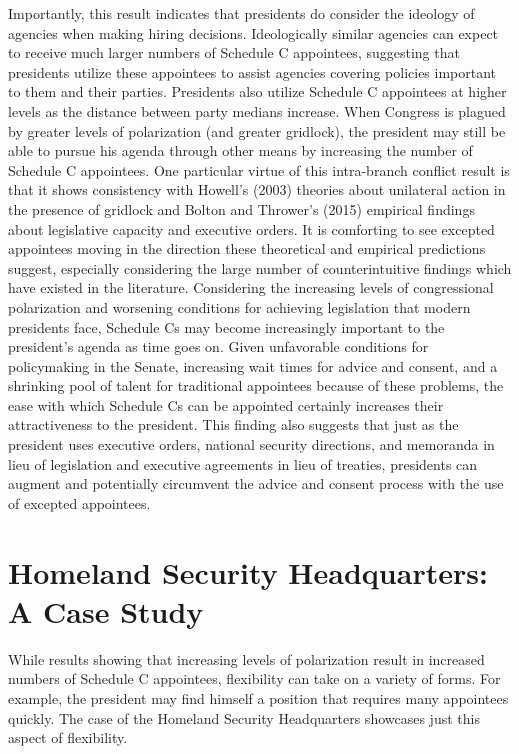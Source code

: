 \documentclass[12pt]{article}
\begin{document}
Importantly, this result indicates that presidents do consider the ideology of agencies when making hiring decisions. Ideologically similar agencies can expect to receive much larger numbers of Schedule C appointees, suggesting that presidents utilize these appointees to assist agencies covering policies important to them and their parties. Presidents also utilize Schedule C appointees at higher levels as the distance between party medians increase. When Congress is plagued by greater levels of polarization (and greater gridlock), the president may still be able to pursue his agenda through other means by increasing the number of Schedule C appointees. One particular virtue of this intra-branch conflict result is that it shows consistency with Howell's (2003) theories about unilateral action in the presence of gridlock and Bolton and Thrower's (2015) empirical findings about legislative capacity and executive orders. It is comforting to see excepted appointees moving in the direction these theoretical and empirical predictions suggest, especially considering the large number of counterintuitive findings which have existed in the literature. Considering the increasing levels of congressional polarization and worsening conditions for achieving legislation that modern presidents face, Schedule Cs may become increasingly important to the president's agenda as time goes on. Given unfavorable conditions for policymaking in the Senate, increasing wait times for advice and consent, and a shrinking pool of talent for traditional appointees because of these problems, the ease with which Schedule Cs can be appointed certainly increases their attractiveness to the president. This finding also suggests that just as the president uses executive orders, national security directions, and memoranda in lieu of legislation and executive agreements in lieu of treaties, presidents can augment and potentially circumvent the advice and consent process with the use of excepted appointees.

\section*{Homeland Security Headquarters: A Case Study}
While results showing that increasing levels of polarization result in increased numbers of Schedule C appointees, flexibility can take on a variety of forms. For example, the president may find himself a position that requires many appointees quickly. The case of the Homeland Security Headquarters showcases just this aspect of flexibility. 
\end{document}
